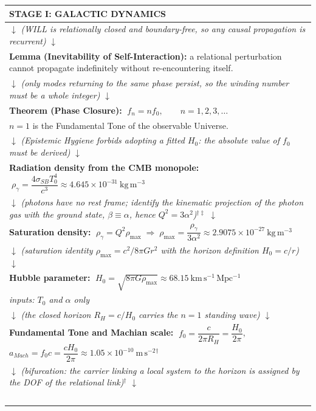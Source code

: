 \begin{tcolorbox}[colback=gray!5, colframe=black!80!black,
                  title=Derivation Chain Map --- WILL RG II (A): Inherited Core and Stage I]
\begin{center}
\begin{tabular}{|>{\centering\arraybackslash}p{}|}
\textbf{\large STAGE I: GALACTIC DYNAMICS}\\\hline
$\downarrow$ \textit{(WILL is relationally closed and boundary-free, so any causal propagation is recurrent)} $\downarrow$\\\hline
\textbf{Lemma (Inevitability of Self-Interaction):} a relational perturbation cannot propagate indefinitely without re-encountering itself.\\\hline
$\downarrow$ \textit{(only modes returning to the same phase persist, so the winding number must be a whole integer)} $\downarrow$\\\hline
\textbf{Theorem (Phase Closure):} $\;\boxed{f_{n}=nf_{0},\qquad n=1,2,3,\dots}$ \\
$n=1$ is the Fundamental Tone of the observable Universe.\\[4pt]\hline
$\downarrow$ \textit{(Epistemic Hygiene forbids adopting a fitted $H_{0}$: the absolute value of $f_{0}$ must be derived)} $\downarrow$\\\hline
\textbf{Radiation density from the CMB monopole:} $\;\rho_{\gamma}=\dfrac{4\sigma_{SB}T_{0}^{4}}{c^{3}}\approx 4.645\times10^{-31}\ \mathrm{kg\,m^{-3}}$\\[4pt]\hline
$\downarrow$ \textit{(photons have no rest frame; identify the kinematic projection of the photon gas with the ground state, $\beta\equiv\alpha$, hence $Q^{2}=3\alpha^{2}$)}$^{\dagger\ddagger}$ $\downarrow$\\\hline
\textbf{Saturation density:} $\;\rho_{\gamma}=Q^{2}\rho_{\max}\;\Longrightarrow\;
\boxed{\rho_{\max}=\dfrac{\rho_{\gamma}}{3\alpha^{2}}}\approx 2.9075\times10^{-27}\ \mathrm{kg\,m^{-3}}$\\[6pt]\hline
$\downarrow$ \textit{(saturation identity $\rho_{\max}=c^{2}/8\pi Gr^{2}$ with the horizon definition $H_{0}=c/r$)} $\downarrow$\\\hline
\textbf{Hubble parameter:} $\;\boxed{H_{0}=\sqrt{8\pi G\rho_{\max}}\approx 68.15\ \mathrm{km\,s^{-1}\,Mpc^{-1}}}$\\
\textit{inputs: $T_{0}$ and $\alpha$ only}\\[6pt]\hline
$\downarrow$ \textit{(the closed horizon $R_{H}=c/H_{0}$ carries the $n=1$ standing wave)} $\downarrow$\\\hline
\textbf{Fundamental Tone and Machian scale:} $\;f_{0}=\dfrac{c}{2\pi R_{H}}=\dfrac{H_{0}}{2\pi}$, \quad
$a_{Mach}=f_{0}c=\dfrac{cH_{0}}{2\pi}\approx1.05\times10^{-10}\ \mathrm{m\,s^{-2}}$$^{\dagger}$\\[6pt]\hline
$\downarrow$ \textit{(bifurcation: the carrier linking a local system to the horizon is assigned by the DOF of the relational link)}$^{\dagger}$ $\downarrow$\\\hline
$$
\end{tabular}
\end{center}
\end{tcolorbox}
